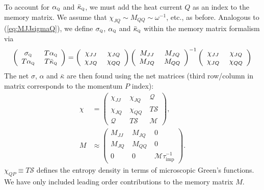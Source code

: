 \documentclass[10pt, oneside]{book}
\begin{document}
\begin{doublespace}
To account for $\alpha_{\textsc{q}}$ and $\bar\kappa_{\textsc{q}}$, we must add the heat current $Q$ as an index to the memory matrix.   We assume that $\chi_{JQ}\sim M_{QQ} \sim \omega^{-1}$, etc., as before.  Analogous to (\ref{eq:MJJsigmaQ}),  we define $\sigma_{\textsc{q}}$,  $\alpha_{\textsc{q}}$ and $\bar\kappa_{\textsc{q}}$ within the memory matrix formalism via  \begin{equation}
\left(\begin{array}{cc} \sigma_{\textsc{q}} &\  T\alpha_{\textsc{q}} \\ T\alpha_{\textsc{q}} &\ T\bar\kappa_{\textsc{q}} \end{array}\right) =  \left(\begin{array}{cc} \chi_{JJ} &\  \chi_{JQ} \\ \chi_{JQ} &\ \chi_{QQ} \end{array}\right) \left(\begin{array}{cc} M_{JJ} &\  M_{JQ} \\ M_{JQ} &\ M_{QQ} \end{array}\right)^{-1} \left(\begin{array}{cc} \chi_{JJ} &\  \chi_{JQ} \\ \chi_{JQ} &\ \chi_{QQ} \end{array}\right)   \label{eq:MJJ2}
\end{equation}
The net $\sigma$, $\alpha$ and $\bar\kappa$ are then found using the net matrices (third row/column in matrix corresponds to the momentum $P$ index): \begin{subequations}\begin{align}
\chi &= \left(\begin{array}{ccc} \chi_{JJ} &\  \chi_{JQ} &\ \mathcal{Q} \\ \chi_{JQ} &\ \chi_{QQ} &\ T\mathcal{S} \\ \mathcal{Q} &\ T\mathcal{S} &\ \mathcal{M} \end{array}\right), \\
M &\approx \left(\begin{array}{ccc} M_{JJ} &\  M_{JQ} &\ 0 \\ M_{JQ} &\ M_{QQ} &\ 0 \\ 0 &\ 0 &\ \mathcal{M} \tau^{-1}_{\mathrm{imp}} \end{array}\right).
\end{align}\end{subequations}
$\chi_{QP} \equiv T\mathcal{S}$ defines the entropy density in terms of microscopic Green's functions.  We have only included leading order contributions to the memory matrix $M$.
 

\end{doublespace}
\end{document}
